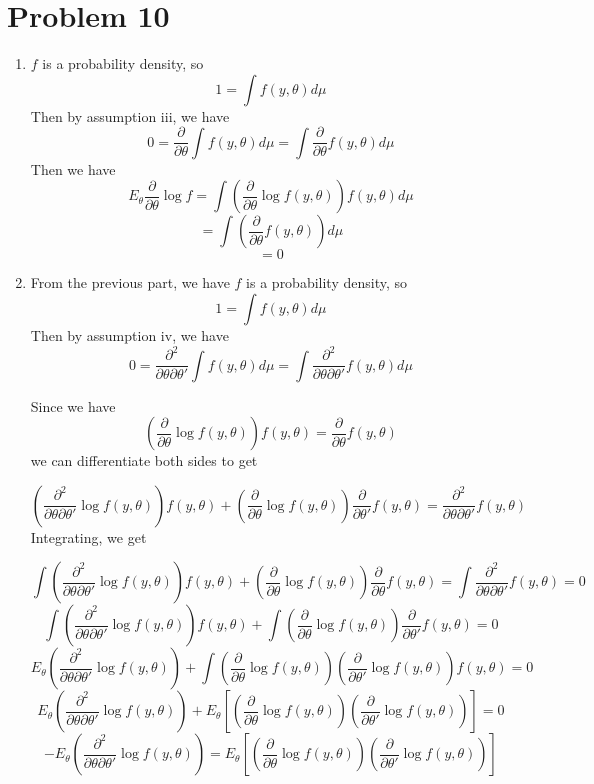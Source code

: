 \documentclass[10pt,letter]{article}
\begin{document}
\section*{Problem 10}
\begin{enumerate}[label=(\alph*)]
\item $f$ is a probability density, so
\[ 1 = \int f(y, \theta) d\mu  \]
Then by assumption iii, we have
\[ 0 = \frac{\partial}{\partial \theta}\int f(y, \theta) d\mu  = \int \frac{\partial}{\partial \theta } f(y, \theta) d\mu  \]
Then we have
\[ E_\theta \frac{\partial}{\partial \theta}\log f = \int \left(\frac{\partial}{\partial \theta}\log f(y, \theta) \right) f(y, \theta) d\mu \]
\[ = \int \left(\frac{\partial}{\partial \theta} f(y, \theta) \right) d\mu \]
\[ = 0 \]
\item From the previous part, we have $f$ is a probability density, so
\[ 1 = \int f(y, \theta) d\mu  \]
Then by assumption iv, we have
\[ 0 = \frac{\partial^2}{\partial \theta\partial \theta'}\int f(y, \theta) d\mu  = \int \frac{\partial^2}{\partial \theta \partial \theta'} f(y, \theta) d\mu  \]

Since we have
\[ \left(\frac{\partial}{\partial \theta}\log f(y, \theta) \right) f(y, \theta) = \frac{\partial}{\partial \theta} f(y, \theta)\]
we can differentiate both sides to get

\[ \left(\frac{\partial^2}{\partial \theta \partial \theta'}\log f(y, \theta) \right) f(y, \theta) + \left(\frac{\partial}{\partial \theta}\log f(y, \theta) \right) \frac{\partial}{\partial \theta'} f(y, \theta) = \frac{\partial^2}{\partial \theta \partial \theta'} f(y, \theta)\]
Integrating, we get

\[ \int \left(\frac{\partial^2}{\partial \theta \partial \theta'}\log f(y, \theta) \right) f(y, \theta) + \left(\frac{\partial}{\partial \theta}\log f(y, \theta) \right) \frac{\partial}{\partial \theta} f(y, \theta) = \int \frac{\partial^2}{\partial \theta \partial \theta'} f(y, \theta) = 0\]
\[ \int \left(\frac{\partial^2}{\partial \theta \partial \theta'}\log f(y, \theta) \right) f(y, \theta) + \int \left(\frac{\partial}{\partial \theta}\log f(y, \theta) \right) \frac{\partial}{\partial \theta'} f(y, \theta) = 0 \]
\[ E_\theta \left(\frac{\partial^2}{\partial \theta \partial \theta'}\log f(y, \theta) \right)  + \int \left(\frac{\partial}{\partial \theta}\log f(y, \theta) \right) \left(\frac{\partial}{\partial \theta'} \log f(y, \theta)\right) f(y, \theta) = 0 \]
\[ E_\theta \left(\frac{\partial^2}{\partial \theta \partial \theta'}\log f(y, \theta) \right)  + E_\theta \left[ \left(\frac{\partial}{\partial \theta}\log f(y, \theta) \right) \left(\frac{\partial}{\partial \theta'} \log f(y, \theta)\right) \right] = 0 \]
\[ -E_\theta \left(\frac{\partial^2}{\partial \theta \partial \theta'}\log f(y, \theta) \right)  = E_\theta \left[ \left(\frac{\partial}{\partial \theta}\log f(y, \theta) \right) \left(\frac{\partial}{\partial \theta'} \log f(y, \theta)\right) \right]  \]

\end{enumerate}
\end{document}
